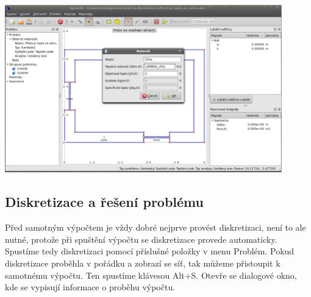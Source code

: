 \documentclass[a4paper, oneside]{article}
\begin{document}
\includegraphics[width=12cm]{Definice_materialu.eps}\\
\subsection{Diskretizace a řešení problému}
Před samotným výpočtem je vždy dobré nejprve provést diskretizaci, není to ale nutné, protože při spuštění výpočtu se diskretizace provede automaticky. Spustíme tedy diskretizaci pomocí příslušné položky v menu Problém. Pokud diskretizace proběhla v pořádku a zobrazí se síť, tak můžeme přistoupit k samotnému výpočtu. Ten spustíme klávesou Alt+S. Otevře se dialogové okno, kde se vypisují informace o proběhu výpočtu.\\
\end{document}

